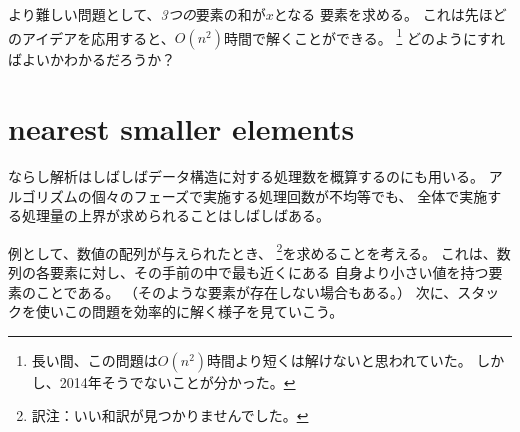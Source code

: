 
より難しい問題として、\emph{3つの}要素の和が$x$となる
要素を求める。
これは先ほどのアイデアを応用すると、$O(n^2)$時間で解くことができる。
\footnote{長い間、この問題は$O(n^2)$時間より短くは解けないと思われていた。
しかし、2014年そうでないことが分かった。\cite{gro14}}
どのようにすればよいかわかるだろうか？

\begin{comment}
\section{Nearest smaller elements}

\index{nearest smaller elements}

Amortized analysis is often used to
estimate the number of operations
performed on a data structure.
The operations may be distributed unevenly so
that most operations occur during a
certain phase of the algorithm, but the total
number of the operations is limited.

As an example, consider the problem
of finding for each array element
the \key{nearest smaller element}, i.e.,
the first smaller element that precedes the element
in the array.
It is possible that no such element exists,
in which case the algorithm should report this.
Next we will see how the problem can be
efficiently solved using a stack structure.
\end{comment}

\section{nearest smaller elements}


ならし解析はしばしばデータ構造に対する処理数を概算するのにも用いる。
アルゴリズムの個々のフェーズで実施する処理回数が不均等でも、
全体で実施する処理量の上界が求められることはしばしばある。

例として、数値の配列が与えられたとき、 \footnote{
訳注：いい和訳が見つかりませんでした。}を求めることを考える。
これは、数列の各要素に対し、その手前の中で最も近くにある
自身より小さい値を持つ要素のことである。
（そのような要素が存在しない場合もある。）
次に、スタックを使いこの問題を効率的に解く様子を見ていこう。

\begin{comment}
We go through the array from left to right
and maintain a stack of array elements.
At each array position, we remove elements from the stack
until the top element is smaller than the
current element, or the stack is empty.
Then, we report that the top element is
the nearest smaller element of the current element,
or if the stack is empty, there is no such element.
Finally, we add the current element to the stack.

As an example, consider the following array:
\end{comment}

